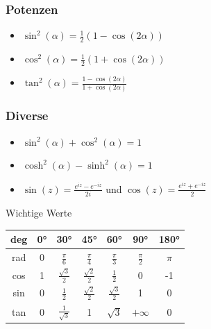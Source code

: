 \documentclass[a4paper,10pt]{article}
\begin{document}
\subsubsection{Potenzen}
\begin{itemize}
 \item $\sin^2(\alpha) = \frac{1}{2}(1-\cos(2\alpha))$
 \item $\cos^2(\alpha) = \frac{1}{2}(1+\cos(2\alpha))$
 \item $\tan^2(\alpha) = \frac{1-\cos(2\alpha)}{1+\cos(2\alpha)}$
\end{itemize}

\subsubsection{Diverse}

\begin{itemize}
 \item $\sin^2(\alpha) + \cos^2(\alpha) = 1$
 \item $\cosh^2(\alpha) - \sinh^2(\alpha) = 1$
 \item $\sin(z) = \frac{e^{iz} - e^{-iz}}{2i}$ und $\cos(z) = \frac{e^{iz} + e^{-iz}}{2}$
\end{itemize}

\begingroup
\renewcommand*{\arraystretch}{2}

\begin{mainbox}{Wichtige Werte}
  \begin{center} 
    \begin{tabular}{c|cccccc}
      deg & 0° & 30° & 45° & 60° & 90° & 180° \\
      \midrule
      rad & 0 & $\frac{\pi}{6}$ & $\frac{\pi}{4}$ & $\frac{\pi}{3}$ & $\frac{\pi}{2}$ & $\pi$ \\
      cos & 1 & $\frac{\sqrt{3}}{2}$ & $\frac{\sqrt{2}}{2}$ & $\frac{1}{2}$ & 0 & -1 \\
      sin & 0 & $\frac{1}{2}$ & $\frac{\sqrt{2}}{2}$ & $\frac{\sqrt{3}}{2}$ & 1 & 0 \\
      tan & 0 & $\frac{1}{\sqrt{3}}$ & 1 & $\sqrt{3}$ & $+\infty$ & 0 \\
    \end{tabular}
  \end{center}
\end{mainbox}
\end{document}
